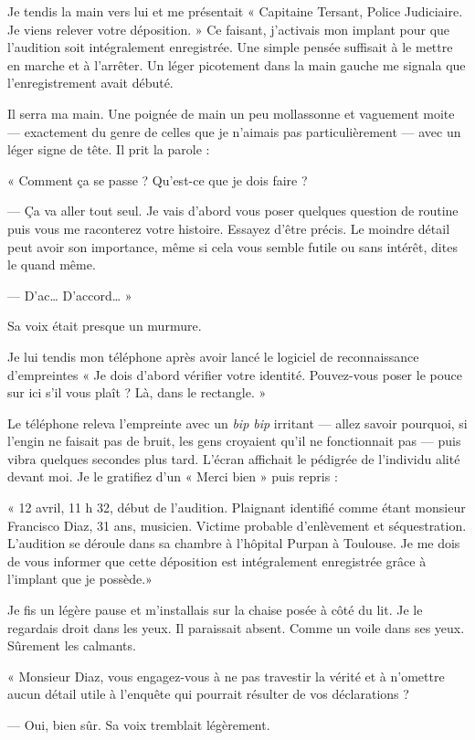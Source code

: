 Je tendis la main vers lui et me présentait « Capitaine Tersant, Police Judiciaire. Je viens relever votre déposition.
» Ce faisant, j'activais mon implant pour que l'audition soit intégralement enregistrée. Une simple pensée suffisait à
le mettre en marche et à l'arrêter. Un léger picotement dans la main gauche me signala que l'enregistrement avait
débuté.

Il serra ma main. Une poignée de main un peu mollassonne et vaguement moite — exactement du genre de celles que je
n'aimais pas particulièrement — avec un léger signe de tête. Il prit la parole :

« Comment ça se passe ? Qu'est-ce que je dois faire ?

— Ça va aller tout seul. Je vais d'abord vous poser quelques question de routine puis vous me raconterez votre
histoire. Essayez d'être précis. Le moindre détail peut avoir son importance, même si cela vous semble futile ou sans
intérêt, dites le quand même.

— D'ac… D'accord… »

Sa voix était presque un murmure.

Je lui tendis mon téléphone après avoir lancé le logiciel de reconnaissance d'empreintes « Je dois d'abord vérifier
votre identité. Pouvez-vous poser le pouce sur ici s'il vous plaît ? Là, dans le rectangle. »

Le téléphone releva l'empreinte avec un \emph{bip bip} irritant — allez savoir pourquoi, si l'engin ne faisait pas de
bruit, les gens croyaient qu'il ne fonctionnait pas — puis vibra quelques secondes plus tard. L'écran affichait le
pédigrée de l'individu alité devant moi. Je le gratifiez d'un « Merci bien » puis repris :

« 12 avril, 11 h 32, début de l'audition. Plaignant identifié comme étant monsieur Francisco Diaz, 31 ans, musicien.
Victime probable d'enlèvement et séquestration. L'audition se déroule dans sa chambre à l'hôpital Purpan à Toulouse. Je
me dois de vous informer que cette déposition est intégralement enregistrée grâce à l'implant que je possède.»

Je fis un légère pause et m'installais sur la chaise posée à côté du lit. Je le regardais droit dans les yeux. Il
paraissait absent. Comme un voile dans ses yeux. Sûrement les calmants.

« Monsieur Diaz, vous engagez-vous à ne pas travestir la vérité et à n'omettre aucun détail utile à l'enquête qui
pourrait résulter de vos déclarations ?

— Oui, bien sûr. Sa voix tremblait légèrement.

